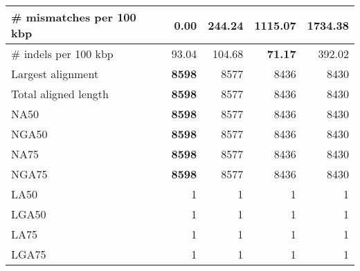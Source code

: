 \documentclass[12pt,a4paper]{article}
\begin{document}
\begin{table}[ht]
\begin{center}
\begin{tabular}{|l*{4}{|r}|}
\# mismatches per 100 kbp & {\bf 0.00} & 244.24 & 1115.07 & 1734.38 \\ \hline
\# indels per 100 kbp & 93.04 & 104.68 & {\bf 71.17} & 392.02 \\ \hline
Largest alignment & {\bf 8598} & 8577 & 8436 & 8430 \\ \hline
Total aligned length & {\bf 8598} & 8577 & 8436 & 8430 \\ \hline
NA50 & {\bf 8598} & 8577 & 8436 & 8430 \\ \hline
NGA50 & {\bf 8598} & 8577 & 8436 & 8430 \\ \hline
NA75 & {\bf 8598} & 8577 & 8436 & 8430 \\ \hline
NGA75 & {\bf 8598} & 8577 & 8436 & 8430 \\ \hline
LA50 & 1 & 1 & 1 & 1 \\ \hline
LGA50 & 1 & 1 & 1 & 1 \\ \hline
LA75 & 1 & 1 & 1 & 1 \\ \hline
LGA75 & 1 & 1 & 1 & 1 \\ \hline
\end{tabular}
\end{center}
\end{table}
\end{document}
